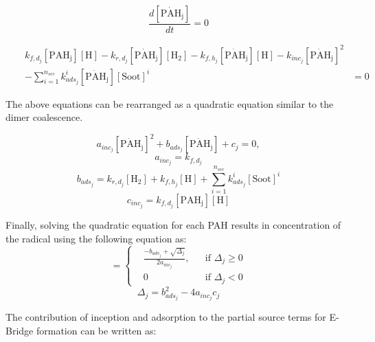 \begin{equation*}
	\frac{d[\mathrm{\dot{PAH}_j}]}{dt} = 0
\end{equation*}

\begin{equation*}
\begin{aligned}
	&&k_{f,d_j}[\mathrm{PAH_j}][\mathrm{H}]
	-k_{r,d_j}[\mathrm{\dot{PAH}_j}][\mathrm{H_2}]
	-k_{f,h_j}[\mathrm{\dot{PAH}_j}][\mathrm{H}]
	-k_{inc_j}[\mathrm{\dot{PAH}_j}]^2 &\\
	&&-\sum_{i=1}^{n_{sec}}k^i_{ads_j}[\mathrm{\dot{PAH}_j}][\mathrm{Soot}]^i
	&= 0
\end{aligned}
\end{equation*}

The above equations can be rearranged as a quadratic equation similar to the dimer coalescence.

\begin{equation}
	a_{inc_j}[\mathrm{\dot{PAH}_j}]^2+
	b_{ads_j}[\mathrm{\dot{PAH}_j}] + c_j = 0,
\end{equation}
\begin{equation}
	a_{inc_j}=k_{f,d_j}
\end{equation}
\begin{equation}
	b_{ads_j}=k_{r,d_j}[\mathrm{H_2}]+k_{f,h_j}[\mathrm{H}]+\sum_{i=1}^{n_{sec}}k^i_{ads_j}[\mathrm{Soot}]^i
\end{equation}
\begin{equation}
	c_{inc_j}=k_{f,d_j}[\mathrm{PAH_j}][\mathrm{H}]
\end{equation}

Finally, solving the quadratic equation for each PAH results in concentration of the radical using the following equation as:
\begin{equation}
	[\mathrm{\mathrm{\dot{PAH}}_j}]=
	\left\{
	\begin{aligned}
		&\frac{-b_{ads_j}+\sqrt{\Delta_j}}{2a_{inc_j}},
		&&
		\text{if } \Delta_j \ge 0
		\\
		& 0 
		&&
		\text{if } \Delta_j < 0
	\end{aligned}
	\right.
	\label{eqn:rad_ebri}
\end{equation}
\begin{equation}
	\Delta_j = b_{ads_j}^2-4a_{inc_j}c_{j}
	\label{eqn:delta_ebri}
\end{equation}

The contribution of inception and adsorption to the partial source terms for E-Bridge formation can be written as:

